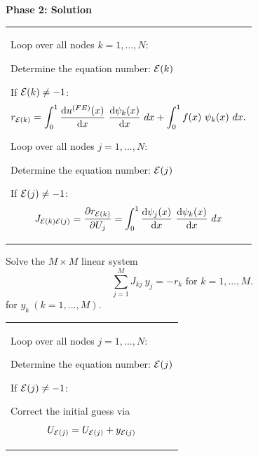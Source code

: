 {\bfseries  Phase 2\+: Solution } ~\newline
\tabulinesep=1mm
\begin{longtabu} spread 0pt [c]{*{1}{|X[-1]}|}
\hline

\begin{DoxyItemize}
\item Loop over all nodes $ k=1,...,N$\+:
\begin{DoxyItemize}
\item Determine the equation number\+: $ {\cal E}(k) $
\item If $ {\cal E}(k) \ne -1 $\+: \[ r_{{\cal E}(k)} = \int_0^1 \frac{\mbox{d} u^{(FE)}(x)}{\mbox{d} x} \ \frac{\mbox{d} \psi_k(x)}{\mbox{d} x} \ dx + \int_0^1 f(x) \ \psi_k(x) \ dx. \]
\begin{DoxyItemize}
\item Loop over all nodes $ j=1,...,N$\+:
\item Determine the equation number\+: $ {\cal E}(j) $
\item If $ {\cal E}(j) \ne -1 $\+: \[ J_{{\cal E}(k){\cal E}(j)} = \frac{\partial r_{{\cal E}(k)}}{\partial U_j} = \int_0^1 \frac{\mbox{d} \psi_j(x)}{\mbox{d} x} \ \frac{\mbox{d} \psi_k(x)}{\mbox{d} x} \ dx \]
\end{DoxyItemize}
\end{DoxyItemize}
\end{DoxyItemize}\\
\end{longtabu}

\begin{DoxyItemize}
\item Solve the $ M \times M$ linear system \[ \sum_{j=1}^{M} J_{kj} \ y_j = - r_k \mbox{\ \ \ for $k=1,...,M.$} \] for $ y_k \ (k=1,...,M)$.
\end{DoxyItemize}\tabulinesep=1mm
\begin{longtabu} spread 0pt [c]{*{1}{|X[-1]}|}
\hline

\begin{DoxyItemize}
\item Loop over all nodes $ j=1,...,N$\+:
\begin{DoxyItemize}
\item Determine the equation number\+: $ {\cal E}(j) $
\item If $ {\cal E}(j) \ne -1 $\+:
\item Correct the initial guess via \[ U_{{\cal E}(j)} = U_{{\cal E}(j)} + y_{{\cal E}(j)} \]
\end{DoxyItemize}
\end{DoxyItemize}\\
\end{longtabu}

